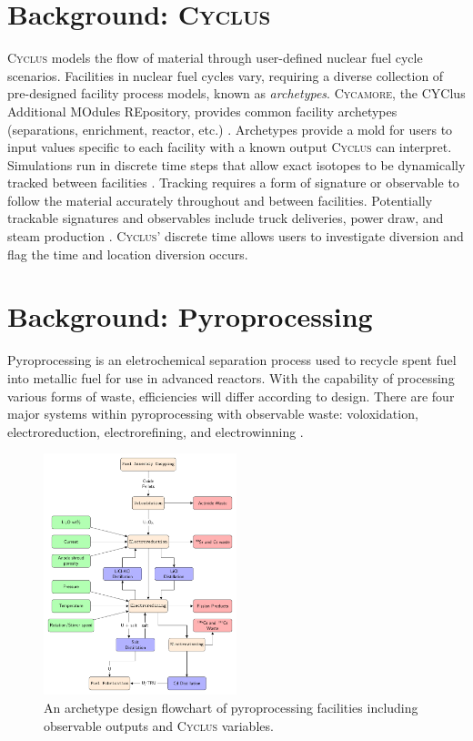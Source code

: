\documentclass{anstrans}
\newcommand{\Cyclus}{\textsc{Cyclus}\xspace}%
\newcommand{\Cycamore}{\textsc{Cycamore}\xspace}%
\begin{document}
\section{Background: \Cyclus}
\Cyclus models the flow of material through user-defined nuclear fuel cycle scenarios. Facilities in nuclear fuel cycles vary, 
requiring a diverse collection of pre-designed facility process models, known as \emph{archetypes}. \Cycamore, the CYClus 
Additional MOdules REpository, provides common facility archetypes (separations, enrichment, reactor, etc.)
\cite{huff_extensions_2014}. Archetypes provide a mold for users to input values specific to each facility with a known output 
\Cyclus can interpret. Simulations run in discrete time steps that allow exact isotopes to be dynamically tracked between facilities \cite{huff_fundamental_2016}. Tracking requires a form of signature or observable to follow the material accurately throughout 
and between facilities. Potentially trackable signatures and observables include truck deliveries, power draw, and steam production  \cite{Hou_2016,Yilmaz_2016}.
\Cyclus' discrete time allows users to investigate diversion and flag the time and location diversion occurs.

\section{Background: Pyroprocessing}
Pyroprocessing is an eletrochemical separation process used to recycle spent fuel into metallic fuel for use in advanced reactors.
With the capability of processing various forms of waste, efficiencies will differ according to design. There are four major 
systems within pyroprocessing with observable waste: voloxidation, electroreduction, electrorefining, and electrowinning \cite{Borrelli_2017}.  

\begin{figure}[ht] %
	\centering
	\includegraphics[width=0.5\textwidth]{flowchart}
	\caption{An archetype design flowchart of pyroprocessing facilities including observable outputs and \Cyclus variables.}
	\label{fig:flowchart}
\end{figure}
\end{document}
